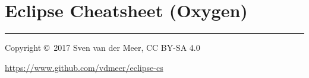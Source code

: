 \documentclass[10pt,a4paper,final,notitlepage]{article}
\begin{document}
	\setlength{\columnseprule}{0.25pt}

	\section{Eclipse Cheatsheet (Oxygen)}

		\begin{multicols}{3}
			\raggedright
			\footnotesize

			\setlength{\columnseprule}{0.25pt}
			\setlength{\premulticols}{1pt}
			\setlength{\postmulticols}{1pt}
			\setlength{\multicolsep}{1pt}
			\setlength{\columnsep}{2pt}
			\raggedcolumns

			
			
			
			
			
			
			
			
			
			
			

			\rule{0.3\linewidth}{0.25pt}
			\scriptsize

			Copyright \copyright\ 2017 Sven van der Meer, CC BY-SA 4.0

			\url{https://www.github.com/vdmeer/eclipse-cs}

		\end{multicols}
\end{document}
